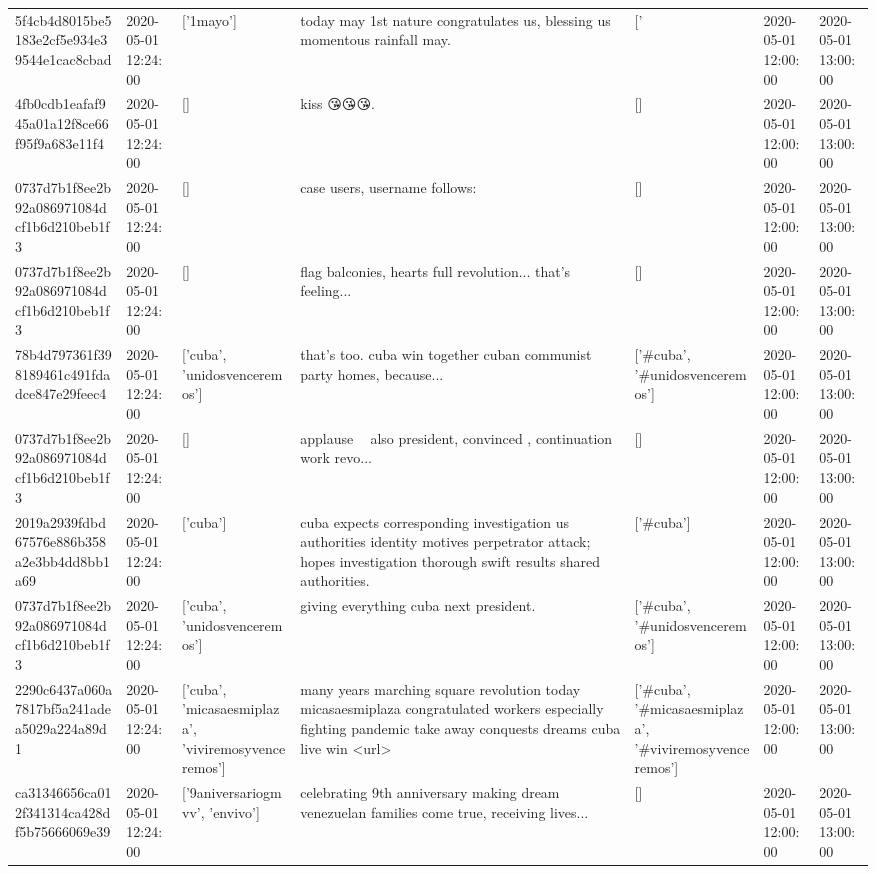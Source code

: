 \begin{tabular}{lllllll}
5f4cb4d8015be5183e2cf5e934e39544e1cac8cbad & 2020-05-01 12:24:00 & ['1mayo'] & today may 1st nature congratulates us, blessing us momentous rainfall may. & ['#1mayo'] & 2020-05-01 12:00:00 & 2020-05-01 13:00:00 \\
4fb0cdb1eafaf945a01a12f8ce66f95f9a683e11f4 & 2020-05-01 12:24:00 & [] & kiss 😘😘😘. & [] & 2020-05-01 12:00:00 & 2020-05-01 13:00:00 \\
0737d7b1f8ee2b92a086971084dcf1b6d210beb1f3 & 2020-05-01 12:24:00 & [] & case users, username follows: & [] & 2020-05-01 12:00:00 & 2020-05-01 13:00:00 \\
0737d7b1f8ee2b92a086971084dcf1b6d210beb1f3 & 2020-05-01 12:24:00 & [] & flag balconies, hearts full revolution... that's feeling... & [] & 2020-05-01 12:00:00 & 2020-05-01 13:00:00 \\
78b4d797361f398189461c491fdadce847e29feec4 & 2020-05-01 12:24:00 & ['cuba', 'unidosvenceremos'] & that's too. cuba win together cuban communist party homes, because... & ['#cuba', '#unidosvenceremos'] & 2020-05-01 12:00:00 & 2020-05-01 13:00:00 \\
0737d7b1f8ee2b92a086971084dcf1b6d210beb1f3 & 2020-05-01 12:24:00 & [] & applause 👏👏 also president, convinced , continuation work revo... & [] & 2020-05-01 12:00:00 & 2020-05-01 13:00:00 \\
2019a2939fdbd67576e886b358a2e3bb4dd8bb1a69 & 2020-05-01 12:24:00 & ['cuba'] & cuba expects corresponding investigation us authorities identity motives perpetrator attack; hopes investigation thorough swift results shared authorities. & ['#cuba'] & 2020-05-01 12:00:00 & 2020-05-01 13:00:00 \\
0737d7b1f8ee2b92a086971084dcf1b6d210beb1f3 & 2020-05-01 12:24:00 & ['cuba', 'unidosvenceremos'] & giving everything cuba next president. & ['#cuba', '#unidosvenceremos'] & 2020-05-01 12:00:00 & 2020-05-01 13:00:00 \\
2290c6437a060a7817bf5a241adea5029a224a89d1 & 2020-05-01 12:24:00 & ['cuba', 'micasaesmiplaza', 'viviremosyvenceremos'] & many years marching square revolution today micasaesmiplaza congratulated workers especially fighting pandemic take away conquests dreams cuba live win <url> & ['#cuba', '#micasaesmiplaza', '#viviremosyvenceremos'] & 2020-05-01 12:00:00 & 2020-05-01 13:00:00 \\
ca31346656ca012f341314ca428df5b75666069e39 & 2020-05-01 12:24:00 & ['9aniversariogmvv', 'envivo'] & celebrating 9th anniversary making dream venezuelan families come true, receiving lives... & [] & 2020-05-01 12:00:00 & 2020-05-01 13:00:00 \\

\end{tabular}
